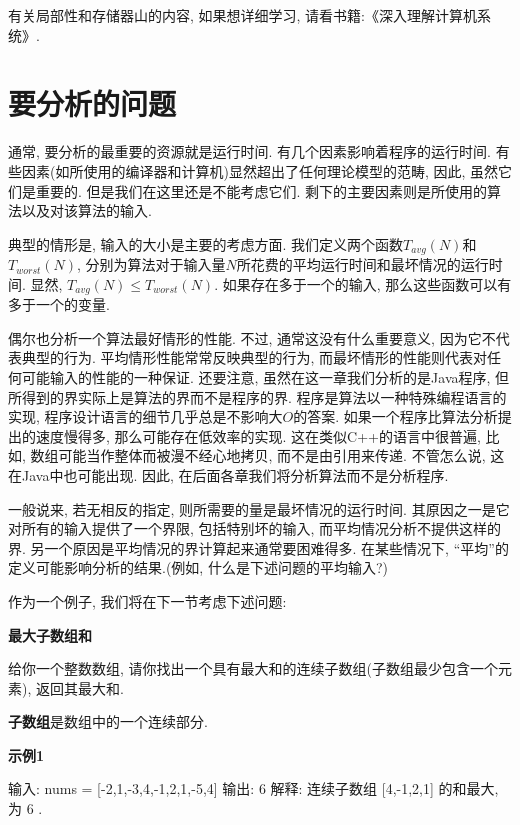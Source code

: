\documentclass[oneside]{ctexbook}
\begin{document}
{\begin{marker}
有关局部性和存储器山的内容, 如果想详细学习, 请看书籍:《深入理解计算机系统》.
\end{marker}

\section{要分析的问题}

通常, 要分析的最重要的资源就是运行时间. 有几个因素影响着程序的运行时间. 有些因素(如所使用的编译器和计算机)显然超出了任何理论模型的范畴, 因此, 虽然它们是重要的. 但是我们在这里还是不能考虑它们. 剩下的主要因素则是所使用的算法以及对该算法的输入.

典型的情形是, 输入的大小是主要的考虑方面. 我们定义两个函数$T_{avg}(N)$和$T_{worst}(N)$, 分别为算法对于输入量$N$所花费的平均运行时间和最坏情况的运行时间. 显然, $T_{avg}(N)\le T_{worst}(N)$. 如果存在多于一个的输入, 那么这些函数可以有多于一个的变量.

偶尔也分析一个算法最好情形的性能. 不过, 通常这没有什么重要意义, 因为它不代表典型的行为. 平均情形性能常常反映典型的行为, 而最坏情形的性能则代表对任何可能输入的性能的一种保证. 还要注意, 虽然在这一章我们分析的是Java程序, 但所得到的界实际上是算法的界而不是程序的界. 程序是算法以一种特殊编程语言的实现, 程序设计语言的细节几乎总是不影响大$O$的答案. 如果一个程序比算法分析提出的速度慢得多, 那么可能存在低效率的实现. 这在类似C++的语言中很普遍, 比如, 数组可能当作整体而被漫不经心地拷贝, 而不是由引用来传递. 不管怎么说, 这在Java中也可能出现. 因此, 在后面各章我们将分析算法而不是分析程序.

一般说来, 若无相反的指定, 则所需要的量是最坏情况的运行时间. 其原因之一是它对所有的输入提供了一个界限, 包括特别坏的输入, 而平均情况分析不提供这样的界. 另一个原因是平均情况的界计算起来通常要困难得多. 在某些情况下, ``平均''的定义可能影响分析的结果.(例如, 什么是下述问题的平均输入?)

作为一个例子, 我们将在下一节考虑下述问题:

\textbf{最大子数组和} 

给你一个整数数组, 请你找出一个具有最大和的连续子数组(子数组最少包含一个元素), 返回其最大和.

\textbf{子数组}是数组中的一个连续部分.

\textbf{示例1}

\begin{mytext}
输入: nums = [-2,1,-3,4,-1,2,1,-5,4]
输出: 6
解释: 连续子数组 [4,-1,2,1] 的和最大, 为 6 .
\end{mytext}

}
\end{document}
